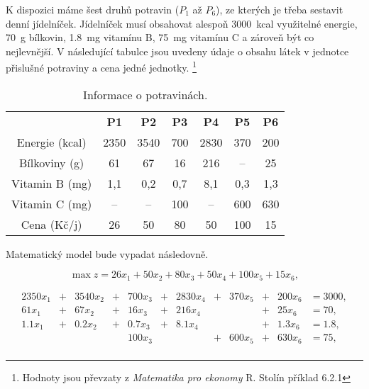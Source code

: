 K dispozici máme šest druhů potravin ($P_1$ až $P_6$), ze kterých je třeba sestavit denní jídelníček.
Jídelníček musí obsahovat alespoň \SI{3000}{kcal} využitelné energie,
\SI{70}{g} bílkovin,
\SI{1,8}{mg} vitamínu B,
\SI{75}{mg} vitamínu C a zároveň být co nejlevnější.
V následující tabulce jsou uvedeny údaje o obsahu látek v jednotce přislušné potraviny a cena jedné jednotky.
\footnote{Hodnoty jsou převzaty z \textit{Matematika pro ekonomy} R. Stolín \cite{matematika_pro_ekonomy} příklad 6.2.1}
\begin{table}[H]
    \centering
    \begin{tabular}{|c|c|c|c|c|c|c|}
        \hline
        \textbf{} & \textbf{P1} & \textbf{P2} & \textbf{P3} & \textbf{P4} & \textbf{P5} & \textbf{P6} \\
        \hhline{|=|=|=|=|=|=|=|}
        Energie (\si{kcal}) & 2350 & 3540 & 700 & 2830 & 370 & 200\\
        \hline
        Bílkoviny (\si{g}) & 61 & 67 & 16 & 216 & -- & 25\\
        \hline
        Vitamin B (\si{mg}) & 1,1 & 0,2 & 0,7 & 8,1 & 0,3 & 1,3\\
        \hline
        Vitamin C (\si{mg}) & -- & -- & 100 & -- & 600 & 630\\
        \hline
        Cena (Kč/j) & 26 & 50 & 80 & 50 & 100 & 15\\
        \hline
    \end{tabular}
    \caption{Informace o potravinách.}
    \label{tab:potraviny}
\end{table}

Matematický model bude vypadat následovně.


\begin{equation*}
    \max z = 26x_1 + 50x_2 + 80x_3 + 50x_4 + 100x_5 + 15x_6,
\end{equation*}


\begin{equation}
    \begin{aligned}
    2350x_1 &+ &3540x_2 &+ &700x_3 &+ &2830x_4 &+ &370x_5 &+ &200x_6 &= 3000, \\
    61x_1 &+ &67x_2 &+ &16x_3 &+ &216x_4 && &+ &25x_6 &= 70, \\
    1.1x_1 &+ &0.2x_2 &+ &0.7x_3 &+ &8.1x_4 && &+ &1.3x_6 &= 1.8, \\
    &&&& 100x_3 && &+ &600x_5 &+ &630x_6 &= 75, \\
    \end{aligned}
\end{equation}

